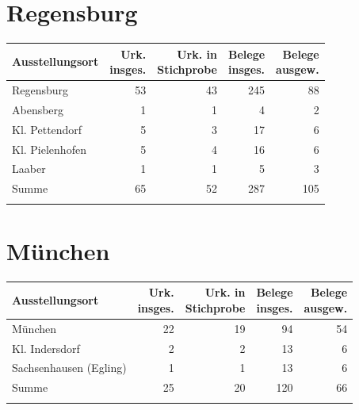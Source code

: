 
\section{Regensburg}

\begin{tabularx}{\linewidth}{X r r r r}
\lsptoprule
Ausstellungsort
	& \makecell{Urk.\\ insges.}
	& \makecell{Urk. in\\ Stichprobe}
	& \makecell{Belege\\ insges.}
	& \makecell{Belege\\ ausgew.}
	\\
\midrule

Regensburg
	& 53
	& 43
	& 245
	& 88
	\\

Abensberg
	& 1
	& 1
	& 4
	& 2
	\\

Kl. Pettendorf
	& 5
	& 3
	& 17
	& 6
	\\

Kl. Pielenhofen
	& 5
	& 4
	& 16
	& 6
	\\

Laaber
	& 1
	& 1
	& 5
	& 3
	\\

\midrule

Summe
	& 65
	& 52
	& 287
	& 105
	\\

\lspbottomrule
\end{tabularx}


\section{München}

\begin{tabularx}{\linewidth}{X r r r r}
\lsptoprule
Ausstellungsort
	& \makecell{Urk.\\ insges.}
	& \makecell{Urk. in\\ Stichprobe}
	& \makecell{Belege\\ insges.}
	& \makecell{Belege\\ ausgew.}
	\\
\midrule

München
	& 22
	& 19
	& 94
	& 54
	\\

Kl. Indersdorf
	& 2
	& 2
	& 13
	& 6
	\\

Sachsenhausen (Egling)
	& 1
	& 1
	& 13
	& 6
	\\

\midrule

Summe
	& 25
	& 20
	& 120
	& 66
	\\

\lspbottomrule
\end{tabularx}

